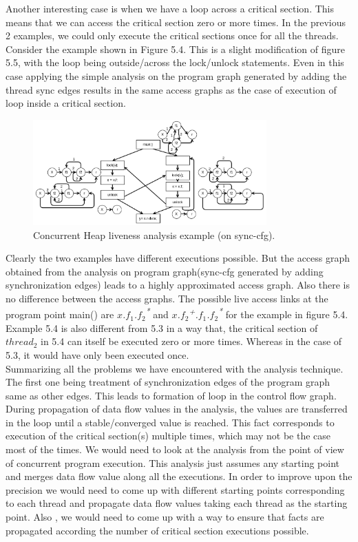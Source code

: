 Another interesting case is when we have a loop across a critical section. This means that we can access the critical section zero or more times. In the previous 2 examples, we could only execute the critical sections once for all the threads. Consider the example shown in Figure 5.4. This is a slight modification of figure 5.5, with the loop being outside/across the lock/unlock statements. Even in this case applying the simple analysis on the program graph generated by adding the thread sync edges results in the same access graphs as the case of execution of loop inside  a critical section. \\

\begin{figure}
	\centering
	\includegraphics[width=0.8\textwidth]{Figures/rsz_loop_outside.png}
	\caption{Concurrent Heap liveness analysis example (on sync-cfg).}
	\label{fig:threadidanalysis}
\end{figure}

Clearly the two examples have different executions possible. But the access graph obtained from the analysis on program graph(sync-cfg generated by adding synchronization edges) leads to a highly approximated access graph. Also there is no difference between the access graphs. The possible live access links at the program point main() are \emph{$x$.$f_1$.$f_2$\textsuperscript{*}} and \emph{$x$.$f_2$\textsuperscript{+}.$f_1$.$f_2$\textsuperscript{*}} for the example in figure 5.4. Example 5.4 is also different from 5.3 in a way that, the critical section of $thread_2$ in 5.4 can itself be executed zero or more times. Whereas in the case of 5.3, it would have only been executed once. \\

Summarizing all the problems we have encountered with the analysis technique. The first one being treatment of synchronization edges of the program graph same as other edges. This leads to formation of loop in the control flow graph. During propagation of data flow values in the analysis, the values are transferred in the loop until a stable/converged value is reached. This fact corresponds to execution of the critical section(s) multiple times, which may not be the case most of the times. We would need to look at the analysis from the point of view of concurrent program execution. This analysis just assumes any starting point and merges data flow value along all the executions. In order to improve upon the precision we would need to come up with different starting points corresponding to each thread and propagate data flow values taking each thread as the starting point. Also , we would need to come up with a way to ensure that facts are propagated according the number of critical section executions possible.           